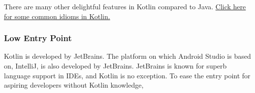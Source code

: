 \documentclass{article}
\begin{document}
There are many other delightful features in Kotlin compared to Java. \href{https://kotlinlang.org/docs/reference/idioms.html}{Click here for some common idioms in Kotlin.}

\subsubsection{Low Entry Point}

Kotlin is developed by JetBrains. The platform on which Android Studio is based on, IntelliJ, is also developed by JetBrains. JetBrains is known for superb language support in IDEs, and Kotlin is no exception. To ease the entry point for aspiring developers without Kotlin knowledge, 
\end{document}
